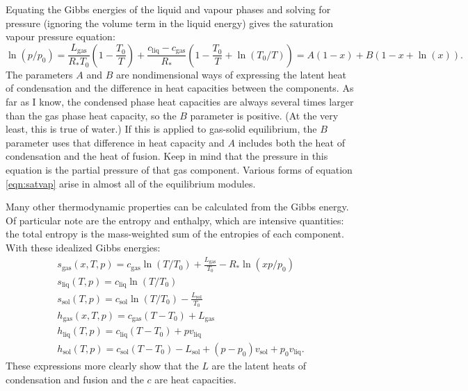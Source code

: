 \documentclass{article}
\newcommand{\gas}{\text{gas}}
\newcommand{\liq}{\text{liq}}
\newcommand{\sol}{\text{sol}}
\begin{document}
Equating the Gibbs energies of the liquid and vapour phases and solving for pressure (ignoring the volume term in the liquid energy) gives the saturation vapour pressure equation:
\begin{equation}\label{eqn:satvap}
    \ln(p/p_0) = \frac{L_{\gas}}{R_* T_0} \left( 1 - \frac{T_0}{T} \right) + \frac{c_{\liq} - c_{\gas}}{R_*} \left( 1 - \frac{T_0}{T} + \ln(T_0/T) \right) = A (1 - x) + B (1 - x + \ln(x)).
\end{equation}
The parameters $A$ and $B$ are nondimensional ways of expressing the latent heat of condensation and the difference in heat capacities between the components. As far as I know, the condensed phase heat capacities are always several times larger than the gas phase heat capacity, so the $B$ parameter is positive. (At the very least, this is true of water.) If this is applied to gas-solid equilibrium, the $B$ parameter uses that difference in heat capacity and $A$ includes both the heat of condensation and the heat of fusion. Keep in mind that the pressure in this equation is the partial pressure of that gas component. Various forms of equation \ref{eqn:satvap} arise in almost all of the equilibrium modules.

Many other thermodynamic properties can be calculated from the Gibbs energy. Of particular note are the entropy and enthalpy, which are intensive quantities: the total entropy is the mass-weighted sum of the entropies of each component. With these idealized Gibbs energies:
\begin{gather*}
    s_{\gas}(x,T,p) = c_{\gas} \ln(T/T_0) + \frac{L_{\gas}}{T_0} - R_* \ln(x p/p_0) \\
    s_{\liq}(T,p) = c_{\liq} \ln(T/T_0) \\
    s_{\sol}(T,p) = c_{\sol} \ln(T/T_0) - \frac{L_{\sol}}{T_0} \\
    h_{\gas}(x,T,p) = c_{\gas} (T - T_0) + L_{\gas} \\
    h_{\liq}(T,p) = c_{\liq} (T - T_0) + p v_{\liq} \\
    h_{\sol}(T,p) = c_{\sol} (T - T_0) - L_{\sol} + (p - p_0) v_{\sol} + p_0 v_{\liq}.
\end{gather*}
These expressions more clearly show that the $L$ are the latent heats of condensation and fusion and the $c$ are heat capacities.
\end{document}
